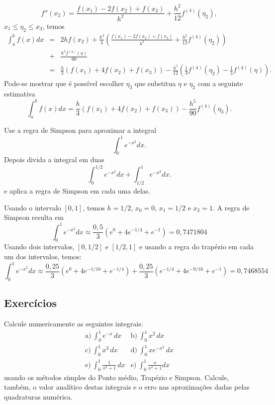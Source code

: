 $$
f''(x_2)=\frac{f(x_1)-2f(x_2)+f(x_3)}{h^2}+\frac{h^2}{12}f^{(4)}(\eta_2),
$$
$x_1\leq \eta_2\leq x_3$, temos
\begin{eqnarray*}
\int_a^bf(x)dx&=&2hf(x_2)+\frac{h^3}{3}\left(\frac{f(x_1)-2f(x_2)+f(x_3)}{h^2}+\frac{h^2}{12}f^{(4)}(\eta_2)\right)\\
&+&\frac{h^5f^{(4)}(\eta)}{60}\\
&=&\frac{h}{3}\left(f(x_1)+4f(x_2)+f(x_3)\right)-\frac{h^5}{12}\left(\frac{1}{3}f^{(4)}(\eta_2)-\frac{1}{5}f^{(4)}(\eta)\right).
\end{eqnarray*}
Pode-se mostrar que é possível escolher $\eta_3$ que substitua $\eta$ e $\eta_2$ com a seguinte estimativa
$$
\int_a^bf(x)dx=\frac{h}{3}\left(f(x_1)+4f(x_2)+f(x_3)\right)-\frac{h^5}{90}f^{(4)}(\eta_3).
$$

\begin{ex}
Use a regra de Simpson para aproximar a integral
$$
\int_0^1e^{-x^2}dx.
$$
Depois divida a integral em duas
$$
\int_0^{1/2}e^{-x^2}dx+\int_{1/2}^{1}e^{-x^2}dx.
$$
e aplica a regra de Simpson em cada uma delas.
\end{ex}
Usando o intervalo $[0,1]$, temos $h=1/2$, $x_0=0$, $x_1=1/2$ e $x_2=1$. A regra de Simpson resulta em
$$
\int_0^1e^{-x^2}dx\approx \frac{0,5}{3}(e^{0}+4e^{-1/4}+e^{-1})=0,7471804
$$
Usando dois intervalos, $[0,1/2]$ e $[1/2,1]$ e usando a regra do trapézio em cada um dos intervalos, temos:
$$
\int_0^1e^{-x^2}dx\approx \frac{0,25}{3}(e^{0}+4e^{-1/16}+e^{-1/4})+\frac{0,25}{3}(e^{-1/4}+4e^{-9/16}+e^{-1})=0,7468554
$$

\subsection*{Exercícios}

\begin{exer}Calcule numericamente as seguintes integrais:
  \begin{eqnarray*}
    \text{a)}~\int_0^1e^{-x}\,dx & \text{b)}~\int_0^1x^2\,dx\\
    \text{c)}~\int_0^1x^3\,dx & \text{d)}~\int_0^1xe^{-x^2}\,dx\\
    \text{e)}~\int_0^1\frac{1}{x^2+1}\,dx &\text{e)}~\int_0^1\frac{x}{x^2+1}dx 
  \end{eqnarray*}
usando os métodos simples do Ponto médio, Trapézio e Simpson. Calcule, também, o valor analítico destas integrais e o erro nas aproximações dadas pelas quadraturas numérica.
\end{exer}
%   

